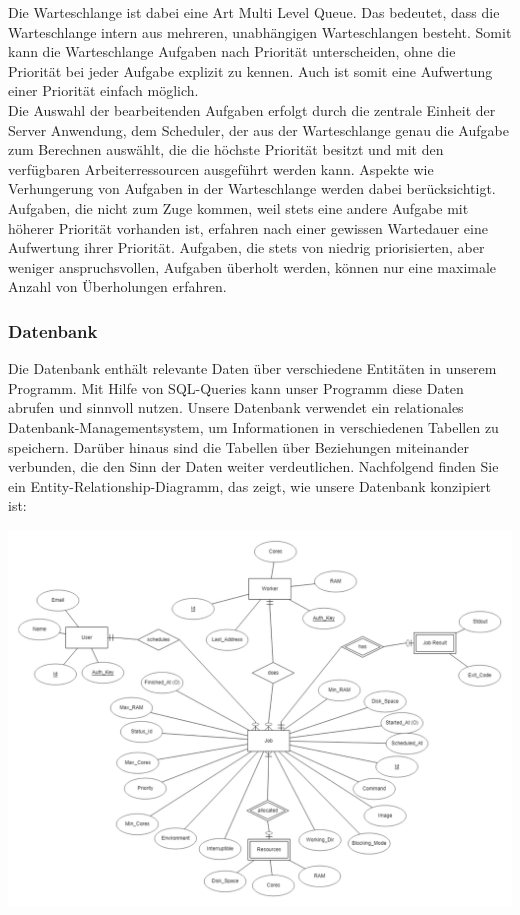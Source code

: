 \documentclass[a4paper,12pt]{article}
\begin{document}
Die Warteschlange ist dabei eine Art Multi Level Queue. Das bedeutet, dass die Warteschlange intern aus mehreren, unabhängigen Warteschlangen besteht. Somit kann die Warteschlange Aufgaben nach Priorität unterscheiden, ohne die Priorität bei jeder Aufgabe explizit zu kennen. Auch ist somit eine Aufwertung einer Priorität einfach möglich.\\


Die Auswahl der bearbeitenden Aufgaben erfolgt durch die zentrale Einheit der Server Anwendung, dem Scheduler, der aus der Warteschlange genau die Aufgabe zum Berechnen auswählt, die die höchste Priorität besitzt und mit den verfügbaren Arbeiterressourcen ausgeführt werden kann. Aspekte wie Verhungerung von Aufgaben in der Warteschlange werden dabei berücksichtigt. Aufgaben, die nicht zum Zuge kommen, weil stets eine andere Aufgabe mit höherer Priorität vorhanden ist, erfahren nach einer gewissen Wartedauer eine Aufwertung ihrer Priorität. Aufgaben, die stets von niedrig priorisierten, aber weniger anspruchsvollen, Aufgaben überholt werden, können nur eine maximale Anzahl von Überholungen erfahren.

\clearpage

\subsubsection{Datenbank}

	Die Datenbank enthält relevante Daten über verschiedene Entitäten in unserem Programm. Mit Hilfe von SQL-Queries kann unser Programm diese Daten abrufen und sinnvoll nutzen.  Unsere Datenbank verwendet ein relationales Datenbank-Managementsystem, um Informationen in verschiedenen Tabellen zu speichern. Darüber hinaus sind die Tabellen über Beziehungen miteinander verbunden, die den Sinn der Daten weiter verdeutlichen. Nachfolgend finden Sie ein Entity-Relationship-Diagramm, das zeigt, wie unsere Datenbank konzipiert ist:

\includegraphics[width=\textwidth]{database_relational}
\end{document}
